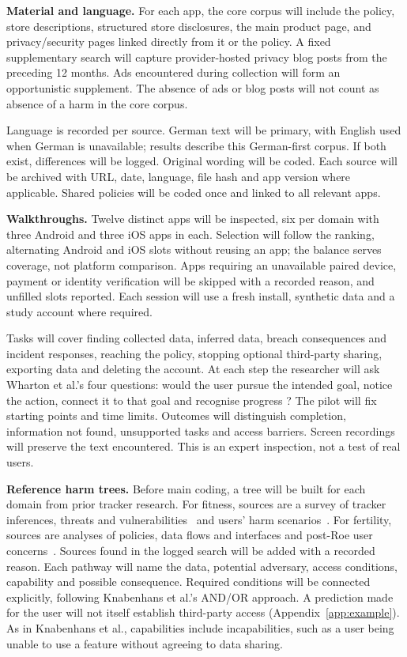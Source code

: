 \documentclass[sigconf,nonacm,natbib=false]{acmart}
\begin{document}
\textbf{Material and language.} For each app, the core corpus will include
the policy, store descriptions, structured store disclosures, the main product
page, and privacy/security pages linked directly from it or the policy. A
fixed supplementary search will capture provider-hosted privacy blog posts
from the preceding 12 months. Ads encountered during collection will form an
opportunistic supplement. The absence of ads or blog posts will not count as
absence of a harm in the core corpus.

Language is recorded per source. German text will be primary, with English
used when German is unavailable; results describe this German-first corpus.
If both exist, differences will be logged. Original wording will be coded.
Each source will be archived with URL, date, language, file hash and app
version where applicable. Shared policies will be coded
once and linked to all relevant apps.

\textbf{Walkthroughs.} Twelve distinct apps will be inspected, six per domain
with three Android and three iOS apps in each. Selection will follow the
ranking, alternating Android and iOS slots without reusing an app; the balance
serves coverage, not platform comparison. Apps requiring an unavailable paired
device, payment or identity verification will be skipped with a recorded
reason, and unfilled slots reported. Each session will use a fresh install,
synthetic data and a study account where required.

Tasks will cover finding collected data, inferred data, breach consequences
and incident responses, reaching the policy, stopping optional third-party
sharing, exporting data and deleting the account. At each step the researcher
will ask Wharton et al.'s four questions: would the user pursue the intended
goal, notice the action, connect it to that goal and recognise progress
\parencite{wharton1994cognitive}? The pilot will fix starting points and
time limits. Outcomes will distinguish completion, information not found,
unsupported tasks and access barriers. Screen recordings will preserve the
text encountered. This is an expert inspection, not a test of real users.

\textbf{Reference harm trees.} Before main coding, a tree will be built for
each domain from prior tracker research. For fitness, sources are a survey of
tracker inferences, threats and vulnerabilities~\parencite{niksirat2024wearable}
and users' harm scenarios~\parencite{gabriele2020understanding}. For fertility,
sources are analyses of policies, data flows and interfaces
\parencite{shipp2020period,malki2024exploring,hudig2025intimate} and post-Roe
user concerns~\parencite{cao2024deleted}. Sources found in the logged search
will be added with a recorded reason. Each pathway will name the data, potential
adversary, access conditions, capability and possible consequence. Required
conditions will be connected explicitly, following Knabenhans et al.'s
AND/OR approach. A prediction made for the user will not itself establish
third-party access (Appendix~\ref{app:example}). As in Knabenhans et al., capabilities include incapabilities, such as a user
being unable to use a feature without agreeing to data sharing.
\end{document}
